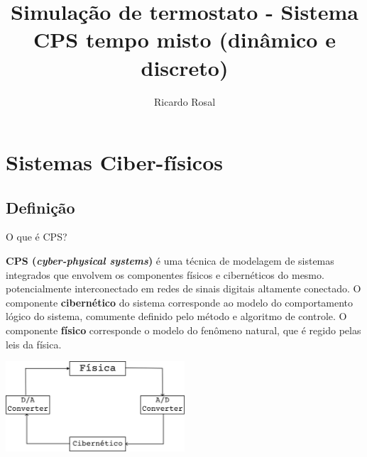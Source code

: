 \documentclass{beamer}
\title{Simulação de termostato - Sistema CPS tempo misto (dinâmico e discreto)}
\author{Ricardo Rosal}
\begin{document}
\begin{frame}[plain]
    \maketitle
\end{frame}




\begin{frame}
	\tableofcontents
\end{frame}

\section{Sistemas Ciber-físicos}

\subsection{Definição}
\begin{frame}{O que é CPS?}
	\par \textbf{CPS (\emph{cyber-physical systems})} é uma técnica de modelagem de sistemas integrados que envolvem os componentes físicos e cibernéticos do mesmo.
	potencialmente interconectado em redes de sinais digitais altamente conectado.
	O componente \textbf{cibernético} do sistema corresponde ao modelo do comportamento lógico do sistema, comumente definido pelo método e algoritmo de controle.
	O componente \textbf{físico} corresponde o modelo do fenômeno natural, que é regido pelas leis da física.\cite{goebel_hybrid_2012}
	\begin{center}
		\includegraphics[width=0.5\textwidth]{imagens/CPS.png}
	\end{center}
\end{frame}
\end{document}
